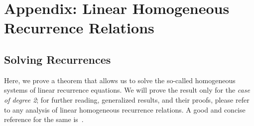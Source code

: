 \documentclass{article}
\begin{document}




\newpage
\section*{Appendix: Linear Homogeneous Recurrence Relations}
\label{sec:appendix}

\subsection*{Solving Recurrences}
Here, we prove a theorem that allows us to solve the so-called homogeneous systems of linear recurrence equations.
We will prove the result only for the \emph{case of degree 2}; for further reading, generalized results, and their proofs, please refer to any analysis of linear homogeneous recurrence relations.
A good and concise reference for the same is~\cite{recurrences}.
\end{document}
